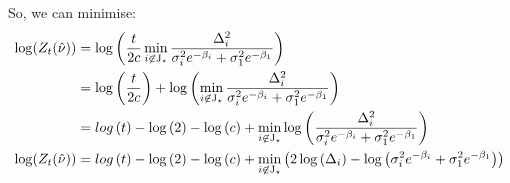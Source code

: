 So, we can minimise:
\begin{align}
\log(Z_{t}(\hat{\nu})) &=\log\left(\frac{t}{2c}\min_{i \not\in \mathrm{J}_{\star}}   \frac{\Delta_i^2}{\sigma_i^2e^{-\beta_i} +\sigma_1^2 e^{-\beta_1} }\right) \\
&=\log\left(\frac{t}{2c}\right) + \log\left(\min_{i \not\in \mathrm{J}_{\star}} \frac{\Delta_i^2}{\sigma_i^2e^{-\beta_i} +\sigma_1^2 e^{-\beta_1} }\right) \\
&=log\left(t\right)-\log\left(2\right) -\log\left(c\right) + \min_{i \not\in \mathrm{J}_{\star}} \log\left(\frac{\Delta_i^2}{\sigma_i^2e^{-\beta_i} +\sigma_1^2 e^{-\beta_1} }\right) \\
\log(Z_{t}(\hat{\nu}))&=log\left(t\right)-\log\left(2\right) -\log\left(c\right) + \min_{i \not\in \mathrm{J}_{\star}} \left(2\log\left(\Delta_i\right) -\log\left({\sigma_i^2e^{-\beta_i} +\sigma_1^2 e^{-\beta_1} }\right)\right)
\end{align}

